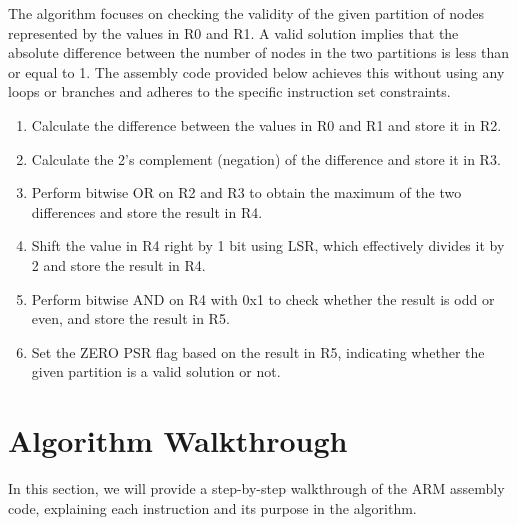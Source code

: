 The algorithm focuses on checking the validity of the given partition of nodes represented by the values in R0 and R1. A valid solution implies that the absolute difference between the number of nodes in the two partitions is less than or equal to 1. The assembly code provided below achieves this without using any loops or branches and adheres to the specific instruction set constraints.

\begin{enumerate}
    \item Calculate the difference between the values in R0 and R1 and store it in R2.
    \item Calculate the 2's complement (negation) of the difference and store it in R3.
    \item Perform bitwise OR on R2 and R3 to obtain the maximum of the two differences and store the result in R4.
    \item Shift the value in R4 right by 1 bit using LSR, which effectively divides it by 2 and store the result in R4.
    \item Perform bitwise AND on R4 with 0x1 to check whether the result is odd or even, and store the result in R5.
    \item Set the ZERO PSR flag based on the result in R5, indicating whether the given partition is a valid solution or not.
\end{enumerate}

\section{Algorithm Walkthrough}

In this section, we will provide a step-by-step walkthrough of the ARM assembly code, explaining each instruction and its purpose in the algorithm.

